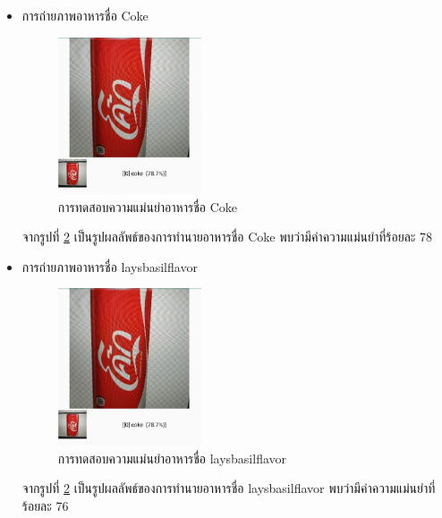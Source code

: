 \begin{itemize}
\begin{itemize}
\end{itemize}

\begin{itemize}
	\item{การถ่ายภาพอาหารชื่อ Coke}

\begin{figure}[H]
	\centering
	\includegraphics[width=0.4\textwidth]{Figures/5/co.png}
	\caption{การทดสอบความแม่นยำอาหารชื่อ Coke}
	\label{Fig:co}
\end{figure}
จากรูปที่ \ref{Fig:co} เป็นรูปผลลัพธ์ของการทำนายอาหารชื่อ Coke พบว่ามีค่าความแม่นยำที่ร้อยละ 78
\newpage

\end{itemize}


\begin{itemize}
	\item{การถ่ายภาพอาหารชื่อ laysbasilflavor}

\begin{figure}[H]
	\centering
	\includegraphics[width=0.4\textwidth]{Figures/5/co.png}
	\caption{การทดสอบความแม่นยำอาหารชื่อ laysbasilflavor}
	\label{Fig:co}
\end{figure}
จากรูปที่ \ref{Fig:co} เป็นรูปผลลัพธ์ของการทำนายอาหารชื่อ laysbasilflavor พบว่ามีค่าความแม่นยำที่ร้อยละ 76
\newpage

\end{itemize}




\end{itemize}
